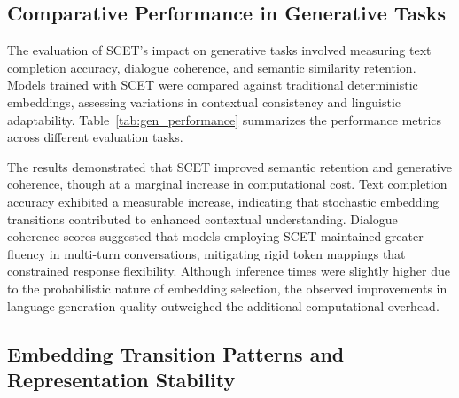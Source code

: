 \documentclass{article}
\begin{document}
\subsection{Comparative Performance in Generative Tasks}

The evaluation of SCET’s impact on generative tasks involved measuring text completion accuracy, dialogue coherence, and semantic similarity retention. Models trained with SCET were compared against traditional deterministic embeddings, assessing variations in contextual consistency and linguistic adaptability. Table~\ref{tab:gen_performance} summarizes the performance metrics across different evaluation tasks.

\begin{table}[h]
	\caption{Comparison of Generative Task Performance between SCET and Traditional Embeddings}
	\label{tab:gen_performance}
	\centering
	\renewcommand{\arraystretch}{1.3}
\end{table}

The results demonstrated that SCET improved semantic retention and generative coherence, though at a marginal increase in computational cost. Text completion accuracy exhibited a measurable increase, indicating that stochastic embedding transitions contributed to enhanced contextual understanding. Dialogue coherence scores suggested that models employing SCET maintained greater fluency in multi-turn conversations, mitigating rigid token mappings that constrained response flexibility. Although inference times were slightly higher due to the probabilistic nature of embedding selection, the observed improvements in language generation quality outweighed the additional computational overhead.

\subsection{Embedding Transition Patterns and Representation Stability}
\end{document}
